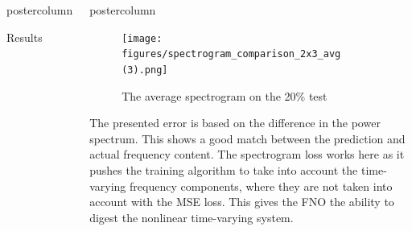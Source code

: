 \documentclass[mathserif]{beamer}
\newlength{\columnheight}
\begin{document}
\begin{frame}
\begin{columns}
\begin{beamercolorbox}[center,wd=\textwidth]{postercolumn}
\begin{minipage}[T]{.95\linewidth}
{\begin{block}{Results}

\end{block}		






    }
\end{minipage}
\end{beamercolorbox}




		\begin{beamercolorbox}[center,wd=\textwidth]{postercolumn}
			\begin{minipage}[T]{.95\linewidth}  %
			     \parbox[t][\columnheight]{\textwidth}{ %
\begin{figure}
    \centering
    \texttt{[image: figures/spectrogram\_comparison\_2x3\_avg (3).png]}
    \caption{The average spectrogram on the 20\% test}
    \label{fig:enter-label}
\end{figure}

The presented error is based on the difference in the power spectrum. This shows a good match between the prediction and actual frequency content. The spectrogram loss works here as it pushes the training algorithm to take into account the time-varying frequency components, where they are not taken into account with the MSE loss. This gives the FNO the ability to digest the nonlinear time-varying system.\\



}
\end{minipage}
\end{beamercolorbox}
\end{columns}
\end{frame}
\end{document}
